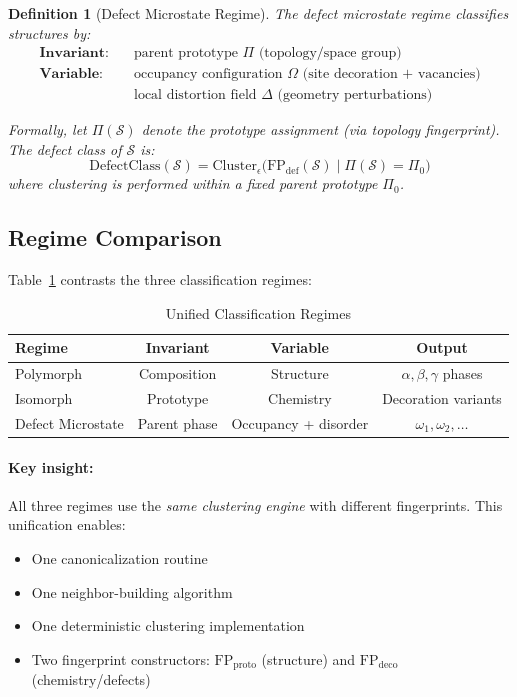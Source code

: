 \documentclass[11pt]{article}
\newtheorem{definition}{Definition}
\begin{document}
\begin{definition}[Defect Microstate Regime]
\label{def:defect-regime}
The defect microstate regime classifies structures by:
\begin{align}
\textbf{Invariant:} \quad & \text{parent prototype } \Pi \text{ (topology/space group)} \\
\textbf{Variable:} \quad & \text{occupancy configuration } \Omega \text{ (site decoration + vacancies)} \nonumber \\
& \text{local distortion field } \Delta \text{ (geometry perturbations)} \nonumber
\end{align}

Formally, let $\Pi(\mathcal{S})$ denote the prototype assignment (via
topology fingerprint). The defect class of $\mathcal{S}$ is:
\begin{equation}
\mathrm{DefectClass}(\mathcal{S}) = \mathrm{Cluster}_{\epsilon}
\big(\mathrm{FP}_{\mathrm{def}}(\mathcal{S}) \;\big|\; \Pi(\mathcal{S}) = \Pi_0\big)
\end{equation}
where clustering is performed \emph{within} a fixed parent prototype $\Pi_0$.
\end{definition}

\subsection{Regime Comparison}

Table~\ref{tab:regime-comparison} contrasts the three classification regimes:

\begin{table}[h]
\centering
\caption{Unified Classification Regimes}
\label{tab:regime-comparison}
\begin{tabular}{lccc}
\toprule
\textbf{Regime} & \textbf{Invariant} & \textbf{Variable} & \textbf{Output} \\
\midrule
Polymorph & Composition & Structure & $\alpha, \beta, \gamma$ phases \\
Isomorph & Prototype & Chemistry & Decoration variants \\
Defect Microstate & Parent phase & Occupancy + disorder & $\omega_1, \omega_2, \ldots$ \\
\bottomrule
\end{tabular}
\end{table}

\paragraph{Key insight:} All three regimes use the \emph{same clustering engine}
with different fingerprints. This unification enables:
\begin{itemize}
  \item One canonicalization routine
  \item One neighbor-building algorithm
  \item One deterministic clustering implementation
  \item Two fingerprint constructors: $\mathrm{FP}_{\mathrm{proto}}$ (structure)
        and $\mathrm{FP}_{\mathrm{deco}}$ (chemistry/defects)
\end{itemize}
\end{document}
